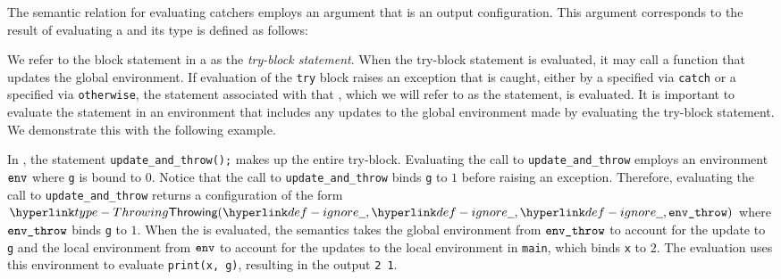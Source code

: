 

The semantic relation for evaluating catchers employs an argument
that is an output configuration. This argument corresponds to the result
of evaluating a \trystatementterm{} and its type is defined as follows:


We refer to the block statement in a
\trystatementterm{} as the \emph{try-block statement}.
When the try-block statement is evaluated, it may call a function that updates
the global environment. If evaluation of the \texttt{try} block raises an exception that is caught,
either by a \catcherterm{} specified via \texttt{catch} or a \catcherterm{} specified via \texttt{otherwise},
the statement associated with that \catcherterm{}, which we will refer to as the \catcherterm{} statement, is evaluated.
It is important to evaluate the \catcherterm{} statement in an environment that includes any updates
to the global environment made by evaluating the try-block statement.
%
We demonstrate this with the following example.

In , the statement \verb|update_and_throw();|
makes up the entire try-block.
Evaluating the call to \verb|update_and_throw| employs an environment $\texttt{env}$ where
\texttt{g} is bound to $0$.
Notice that the call to \verb|update_and_throw| binds \texttt{g} to $1$ before raising an exception.
Therefore, evaluating the call to \verb|update_and_throw| returns a configuration
of the form
$\Throwing(\Ignore, \Ignore, \Ignore, \envthrow)$ where $\texttt{env\_throw}$ binds \texttt{g} to $1$.
When the \catcherterm{} is evaluated, the semantics takes the global environment from $\texttt{env\_throw}$
to account for the update to \texttt{g} and the local environment from $\texttt{env}$ to account for the
updates to the local environment in \texttt{main}, which binds \texttt{x} to $2$.
The evaluation uses this environment to evaluate \texttt{print(x, g)}, resulting in the output \texttt{2 1}.


